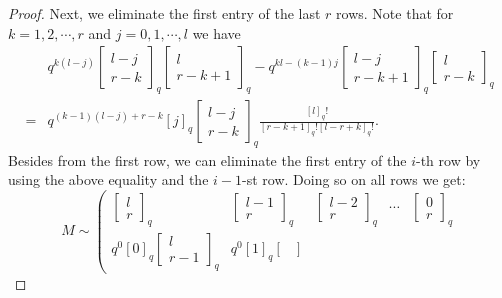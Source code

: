 \documentclass[12pt]{amsart}
\theoremstyle{definition}
\theoremstyle{remark}
\numberwithin{equation}{section}
\numberwithin{figure}{section}
\begin{document}
\begin{proof}
  Next, we eliminate the first entry of the last $r$ rows. Note that for $k=1,2,\cdots,r$ and $j=0,1,\cdots,l$ we have
  \begin{align*}
    &q^{k(l-j)}\begin{bmatrix}
      l-j\\r-k
    \end{bmatrix}_q\begin{bmatrix}
      l\\r-k+1
    \end{bmatrix}_q-q^{kl-(k-1)j}\begin{bmatrix}
      l-j\\r-k+1
    \end{bmatrix}_q\begin{bmatrix}
      l\\r-k
    \end{bmatrix}_q\\
    =&q^{(k-1)(l-j)+r-k}\left[j\right]_q\begin{bmatrix}
      l-j\\r-k
    \end{bmatrix}_q\frac{\left[l\right]_q!}{\left[r-k+1\right]_q!\left[l-r+k\right]_q!}.
  \end{align*}
  Besides from the first row, we can eliminate the first entry of the $i$-th row by using the above equality and the $i-1$-st row. Doing so on all rows we get:
  \[M \sim \left(\begin{array}{ccccc}
    \begin{bmatrix}
    l\\
    r
    \end{bmatrix}_q
    &
    \begin{bmatrix}
    l-1\\
    r
    \end{bmatrix}_q
    &
    \begin{bmatrix}
    l-2\\
    r
    \end{bmatrix}_q
    &
    \cdots 
    &
    \begin{bmatrix}
    0\\
    r
    \end{bmatrix}_q
    \\
    q^{0}\left[0\right]_q\begin{bmatrix}
    l\\
    r-1
    \end{bmatrix}_q
    &
    q^{0}\left[1\right]_q\begin{bmatrix}

\end{bmatrix}
\end{array}\]
\end{proof}
\end{document}
